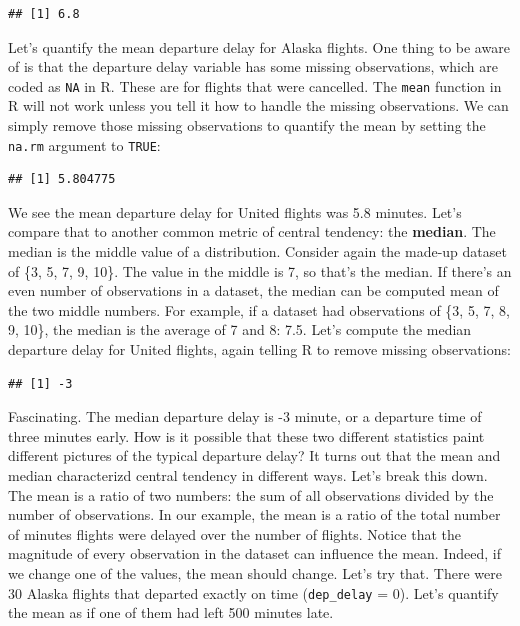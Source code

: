 \documentclass[
]{book}
\newenvironment{Shaded}{\begin{snugshade}}{\end{snugshade}}
\newcommand{\AttributeTok}[1]{\textcolor[rgb]{0.13,0.29,0.53}{#1}}
\newcommand{\ConstantTok}[1]{\textcolor[rgb]{0.56,0.35,0.01}{#1}}
\newcommand{\FunctionTok}[1]{\textcolor[rgb]{0.13,0.29,0.53}{\textbf{#1}}}
\newcommand{\NormalTok}[1]{#1}
\newcommand{\SpecialCharTok}[1]{\textcolor[rgb]{0.81,0.36,0.00}{\textbf{#1}}}
\begin{document}
\begin{verbatim}
## [1] 6.8
\end{verbatim}

Let's quantify the mean departure delay for Alaska flights. One thing to be aware of is that the departure delay variable has some missing observations, which are coded as \texttt{NA} in R. These are for flights that were cancelled. The \texttt{mean} function in R will not work unless you tell it how to handle the missing observations. We can simply remove those missing observations to quantify the mean by setting the \texttt{na.rm} argument to \texttt{TRUE}:

\begin{Shaded}
\end{Shaded}

\begin{verbatim}
## [1] 5.804775
\end{verbatim}

We see the mean departure delay for United flights was 5.8 minutes. Let's compare that to another common metric of central tendency: the \textbf{median}. The median is the middle value of a distribution. Consider again the made-up dataset of \{3, 5, 7, 9, 10\}. The value in the middle is 7, so that's the median. If there's an even number of observations in a dataset, the median can be computed mean of the two middle numbers. For example, if a dataset had observations of \{3, 5, 7, 8, 9, 10\}, the median is the average of 7 and 8: 7.5. Let's compute the median departure delay for United flights, again telling R to remove missing observations:

\begin{Shaded}
\end{Shaded}

\begin{verbatim}
## [1] -3
\end{verbatim}

Fascinating. The median departure delay is -3 minute, or a departure time of three minutes early. How is it possible that these two different statistics paint different pictures of the typical departure delay? It turns out that the mean and median characterizd central tendency in different ways. Let's break this down. The mean is a ratio of two numbers: the sum of all observations divided by the number of observations. In our example, the mean is a ratio of the total number of minutes flights were delayed over the number of flights. Notice that the magnitude of every observation in the dataset can influence the mean. Indeed, if we change one of the values, the mean should change. Let's try that. There were 30 Alaska flights that departed exactly on time (\texttt{dep\_delay} = 0). Let's quantify the mean as if one of them had left 500 minutes late.
\end{document}
